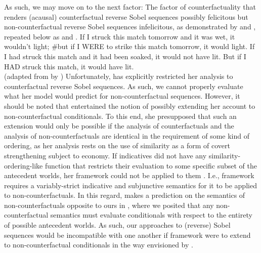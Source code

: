 As such, we may move on to the next factor: The factor of counterfactuality that renders (acausal) counterfactual reverse Sobel sequences possibly felicitous but non-counterfactual reverse Sobel sequences infelicitous, as demonstrated by  and , repeated below as  and .
\ex{}
    If I struck this match tomorrow and it was wet, it wouldn't light; \#but if I \MakeUppercase{were} to strike this match tomorrow, it would light.
\xe
\ex{}If I had struck this match and it had been soaked, it would not have lit. But if I \MakeUppercase{had} struck this match, it would have lit.\\%
\emptyfill(adapted from \textcite[p. 106]{Stalnaker1968} by \textcite[p. 487]{Lewis2018})
\xe
Unfortunately, \textcite{Ippolito2020} has explicitly restricted her analysis to counterfactual reverse Sobel sequences. As such, we cannot properly evaluate what her model would predict for non-counterfactual sequences. However, it should be noted that \textcite{Ippolito2020} entertained the notion of possibly extending her account to non-counterfactual conditionals. To this end, she presupposed that such an extension would only be possible if the analysis of counterfactuals and the analysis of non-counterfactuals are identical in the requirement of some kind of ordering, as her analysis rests on the use of similarity as a form of covert strengthening subject to economy. If indicatives did not have any similarity-ordering-like function that restricts their evaluation to some specific subset of the antecedent worlds, her framework could not be applied to them \parencite[p.~655,~Footnote~16]{Ippolito2020}. I.e.,  framework requires a variably-strict indicative and subjunctive semantics for it to be applied to non-counterfactuals. In this regard, \textcite{Ippolito2020} makes a prediction on the semantics of non-counterfactuals opposite to ours in , where we posited that any non-counterfactual semantics must evaluate conditionals with respect to the entirety of possible antecedent worlds. As such, our approaches to (reverse) Sobel sequences would be incompatible with one another if  framework were to extend to non-counterfactual conditionals in the way envisioned by \textcite{Ippolito2020}.

